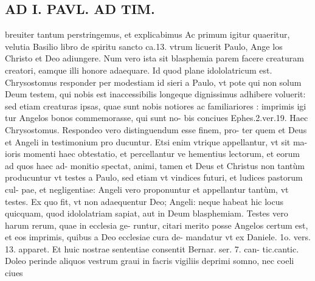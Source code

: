 \documentclass{article}
\begin{document}
\begin{pages}
\section*{AD I. PAVL. AD TIM. }
\marginpar{[ p.B ]}\pstart breuiter tantum perstringemus, et explicabimus Ac primum igitur quaeritur, velutia Basilio libro de spiritu sancto ca.13. vtrum licuerit Paulo, Ange los Christo et Deo adiungere. Num vero ista sit blasphemia parem facere creaturam creatori, eamque  illi honore adaequare. Id quod plane idololatricum est. Chrysostomus responder per modestiam id sieri a Paulo, vt pote qui non solum Deum testem, qui nobis est inaccessibilis longeque dignissimus adhibere voluerit: sed etiam creaturas ipsas, quae sunt nobis notiores ac familiariores : imprimis igi tur Angelos bonos commemorasse, qui sunt no- bis conciues Ephes.2.ver.19. Haec Chrysostomus. Respondeo vero distinguendum esse finem, pro- ter quem et Deus et Angeli in testimonium pro ducuntur. Etsi enim vtrique appellantur, vt sit ma- ioris momenti haec obtestatio, et percellantur ve hementius lectorum, et eorum ad quos haec ad- monitio spectat, animi, tamen et Deus et Christus non tantùm producuntur vt testes a Paulo, sed etiam vt vindices futuri, et ludices pastorum cul- pae, et negligentiae: Angeli vero proponuntur et appellantur tantùm, vt testes. Ex quo fit, vt non adaequentur Deo; Angeli: neque habeat hic locus quicquam, quod idololatriam sapiat, aut in Deum blasphemiam.  \pend\pstart Testes vero harum rerum, quae in ecclesia ge- runtur, citari merito posse Angelos certum est, et eos imprimis, quibus a Deo ecclesiae cura de- mandatur vt ex Daniele. 1o. vers. 13. apparet. Et huic nostrae sententiae consentit Bernar. ser. 7. can- tic.cantic. Doleo perinde aliquos vestrum graui in facris vigiliis deprimi somno, nec coeli ciues  \pend

\end{pages}
\end{document}
